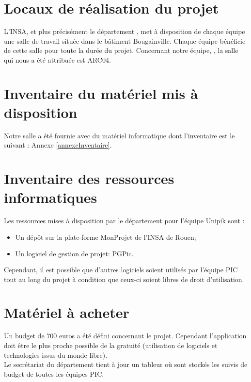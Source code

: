 \section{Locaux de réalisation du projet}
\label{Locaux de réalisation du projet}
\indent L'INSA, et plus précisément le département \ASI{}, met à disposition de chaque équipe une salle de travail située dans le bâtiment Bougainville. Chaque équipe \PIC{} bénéficie de cette salle pour toute la durée du projet.
Concernant notre équipe, \nomEquipe, la salle qui nous a été attribuée est ARC04.

\section{Inventaire du matériel mis à disposition}
\label{Inventaire du matériel mis à disposition}
Notre salle \PICCourt a été fournie avec du matériel informatique dont l'inventaire est le suivant : Annexe \ref{annexeInventaire}.

\section{Inventaire des ressources informatiques}
\label{Inventaire des ressources informatiques}
Les ressources mises à disposition par le département \ASI{} pour l'équipe Unipik sont :

\begin{itemize}
	\item Un dépôt \git{} sur la plate-forme MonProjet de l'INSA de Rouen;
	\item Un logiciel de gestion de projet: PGPic.\\
\end{itemize}

Cependant, il est possible que d'autres logiciels soient utilisés par l'équipe PIC tout au long du projet à condition que ceux-ci soient libres de droit d'utilisation.

\section{Matériel à acheter}
\label{Matériel à acheter}
\indent Un budget de 700 euros a été défini concernant le projet. Cependant l'application doit être le plus proche possible de la gratuité (utilisation de logiciels et technologies issus du monde libre). \\
\indent Le secrétariat du département tient à jour un tableur où sont stockés les suivis de budget de toutes les équipes PIC.

